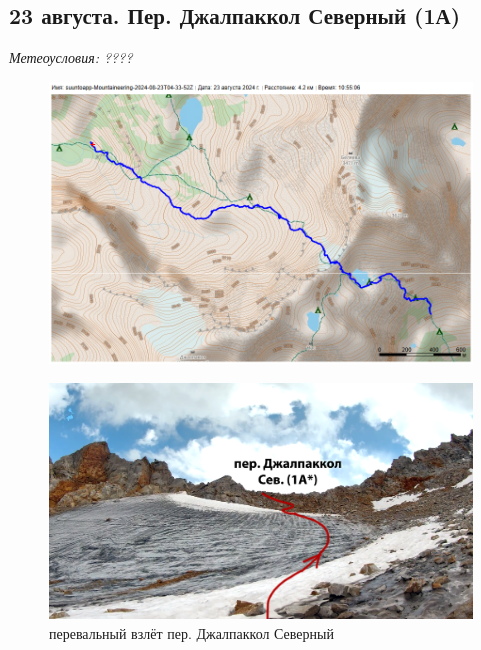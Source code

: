 \subsection{23 августа.  Пер. Джалпаккол Северный (1А)}
\textit{Метеоусловия: ????}

\begin{figure}[h!]
	\centering
	\includegraphics[angle=0, width=0.7\linewidth]{../pics/mini_maps/23}
	\label{fig:mini_23}
\end{figure}




\begin{figure}[h!]
	\centering
	\includegraphics[width=0.7\linewidth]{../pics/dzh_1}
	\caption{перевальный взлёт пер. Джалпаккол Северный}
	\label{fig:dzh_1}
\end{figure}


\newpage
